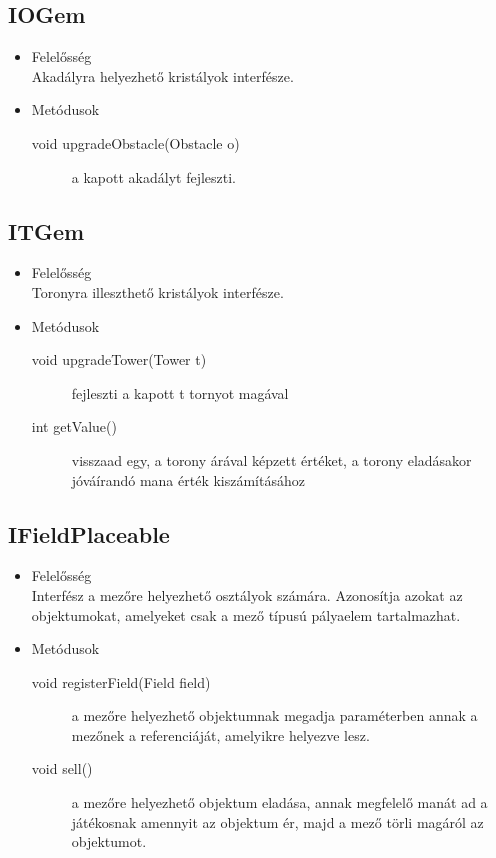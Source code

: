 \subsection{IOGem}
\begin{itemize}
\item Felelősség\\
Akadályra helyezhető kristályok interfésze.

\item Metódusok\\
	\begin{description}
		\item[void upgradeObstacle(Obstacle o)] a kapott akadályt fejleszti.
		
	\end{description}
\end{itemize}
\subsection{ITGem}
\begin{itemize}
\item Felelősség\\
Toronyra illeszthető kristályok interfésze.

\item Metódusok\\
	\begin{description}
		\item[void upgradeTower(Tower t)] fejleszti a kapott t tornyot magával 
\item[int getValue()] visszaad egy, a torony árával képzett értéket, a torony eladásakor jóváírandó mana érték kiszámításához 

		
	\end{description}
\end{itemize}
\subsection{IFieldPlaceable}
\begin{itemize}
\item Felelősség\\
Interfész a mezőre helyezhető osztályok számára. Azonosítja azokat az objektumokat, amelyeket csak a mező típusú pályaelem tartalmazhat.

\item Metódusok\\
	\begin{description}
		\item[void registerField(Field field)] a mezőre helyezhető objektumnak megadja  paraméterben annak a mezőnek a referenciáját, amelyikre helyezve lesz.
\item[void sell()] a mezőre helyezhető objektum eladása, annak megfelelő manát ad a játékosnak amennyit az objektum ér, majd a mező törli magáról az objektumot.

		
	\end{description}
\end{itemize}
